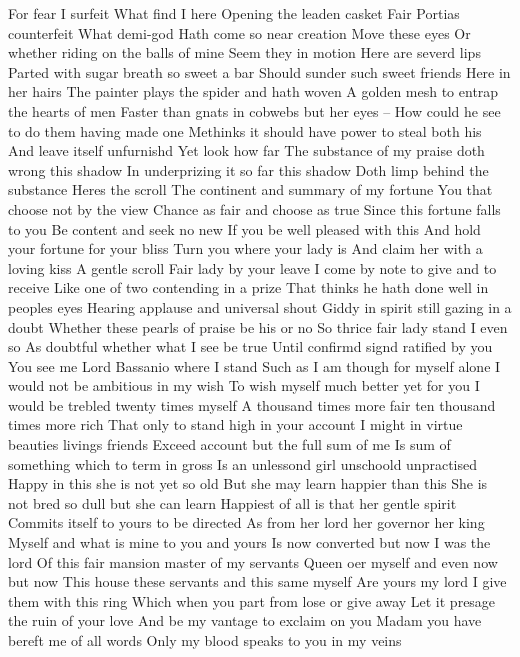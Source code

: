 For fear I surfeit 
What find I here 
Opening the leaden casket 
Fair Portias counterfeit What demi-god 
Hath come so near creation Move these eyes 
Or whether riding on the balls of mine 
Seem they in motion Here are severd lips 
Parted with sugar breath so sweet a bar 
Should sunder such sweet friends Here in her hairs 
The painter plays the spider and hath woven 
A golden mesh to entrap the hearts of men 
Faster than gnats in cobwebs but her eyes -- 
How could he see to do them having made one 
Methinks it should have power to steal both his 
And leave itself unfurnishd Yet look how far 
The substance of my praise doth wrong this shadow 
In underprizing it so far this shadow 
Doth limp behind the substance Heres the scroll 
The continent and summary of my fortune 
You that choose not by the view 
Chance as fair and choose as true 
Since this fortune falls to you 
Be content and seek no new 
If you be well pleased with this 
And hold your fortune for your bliss 
Turn you where your lady is 
And claim her with a loving kiss 
A gentle scroll Fair lady by your leave 
I come by note to give and to receive 
Like one of two contending in a prize 
That thinks he hath done well in peoples eyes 
Hearing applause and universal shout 
Giddy in spirit still gazing in a doubt 
Whether these pearls of praise be his or no 
So thrice fair lady stand I even so 
As doubtful whether what I see be true 
Until confirmd signd ratified by you 
You see me Lord Bassanio where I stand 
Such as I am though for myself alone 
I would not be ambitious in my wish 
To wish myself much better yet for you 
I would be trebled twenty times myself 
A thousand times more fair ten thousand times more rich 
That only to stand high in your account 
I might in virtue beauties livings friends 
Exceed account but the full sum of me 
Is sum of something which to term in gross 
Is an unlessond girl unschoold unpractised 
Happy in this she is not yet so old 
But she may learn happier than this 
She is not bred so dull but she can learn 
Happiest of all is that her gentle spirit 
Commits itself to yours to be directed 
As from her lord her governor her king 
Myself and what is mine to you and yours 
Is now converted but now I was the lord 
Of this fair mansion master of my servants 
Queen oer myself and even now but now 
This house these servants and this same myself 
Are yours my lord I give them with this ring 
Which when you part from lose or give away 
Let it presage the ruin of your love 
And be my vantage to exclaim on you 
Madam you have bereft me of all words 
Only my blood speaks to you in my veins 
